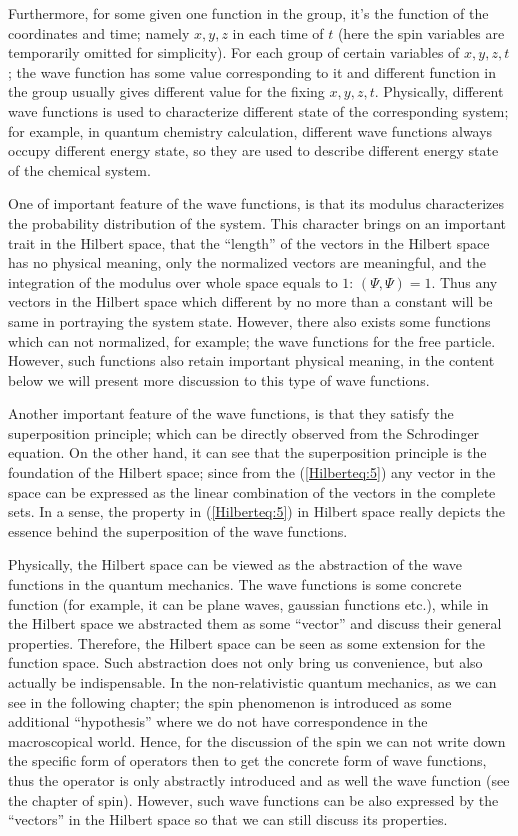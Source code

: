 Furthermore, for some given one function in the group, it's the
function of the coordinates and time; namely $x, y, z$ in each time of
$t$ (here the spin variables are temporarily omitted for
simplicity). For each group of certain variables of $x, y, z, t$; the
wave function has some value corresponding to it and different
function in the group usually gives different value for the fixing $x,
y, z, t$. Physically, different wave functions is used to
characterize different state of the corresponding system; for example,
in quantum chemistry calculation, different wave functions always
occupy different energy state, so they are used to describe different
energy state of the chemical system.

One of important feature of the wave functions, is that its modulus
characterizes the probability distribution of the system. This
character brings on an important trait in the Hilbert space, that the
``length'' of the vectors in the Hilbert space has no physical
meaning, only the normalized vectors are meaningful, and the
integration of the modulus over whole space equals to $1$:
$(\Psi,\Psi) = 1$. Thus any vectors in the Hilbert space which
different by no more than a constant will be same in portraying the
system state. However, there also exists some functions which can not
normalized, for example; the wave functions for the free
particle. However, such functions also retain important physical
meaning, in the content below we will present more discussion to this
type of wave functions.

Another important feature of the wave functions, is that they
satisfy the superposition principle; which can be directly observed
from the Schrodinger equation. On the other hand, it can see that
the superposition principle is the foundation of the Hilbert space;
since from the (\ref{Hilberteq:5}) any vector in the space can be
expressed as the linear combination of the vectors in the complete
sets. In a sense, the property in (\ref{Hilberteq:5}) in Hilbert
space really depicts the essence behind the superposition of the
wave functions.

Physically, the Hilbert space can be viewed as the abstraction of
the wave functions in the quantum mechanics. The wave functions is
some concrete function (for example, it can be plane waves, gaussian
functions etc.), while in the Hilbert space we abstracted them as
some ``vector'' and discuss their general properties. Therefore, the
Hilbert space can be seen as some extension for the function
space\cite{Coden}. Such abstraction does not only bring us
convenience, but also actually be indispensable. In the
non-relativistic quantum mechanics, as we can see in the following
chapter; the spin phenomenon is introduced as some additional
``hypothesis'' where we do not have correspondence in the
macroscopical world. Hence, for the discussion of the spin we can
not write down the specific form of operators then to get the
concrete form of wave functions, thus the operator is only
abstractly introduced and as well the wave function (see the chapter
of spin). However, such wave functions can be also expressed by the
``vectors'' in the Hilbert space so that we can still discuss its
properties.

